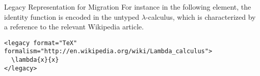 \begin{omgroup}[id=mobj,short=Mathematical Objects]
\begin{module}[id=legacy]
\begin{omgroup}[id=legacy]{Legacy Representation for Migration}
For instance in the following  element, the identity function is encoded
in the untyped $\lambda$-calculus, which is characterized by a reference to the relevant
Wikipedia article.

\begin{lstlisting}[index={legacy}]
<legacy format="TeX" formalism="http://en.wikipedia.org/wiki/Lambda_calculus">
  \lambda{x}{x}
</legacy>
\end{lstlisting}
\end{omgroup}
\end{module}

\end{omgroup}

